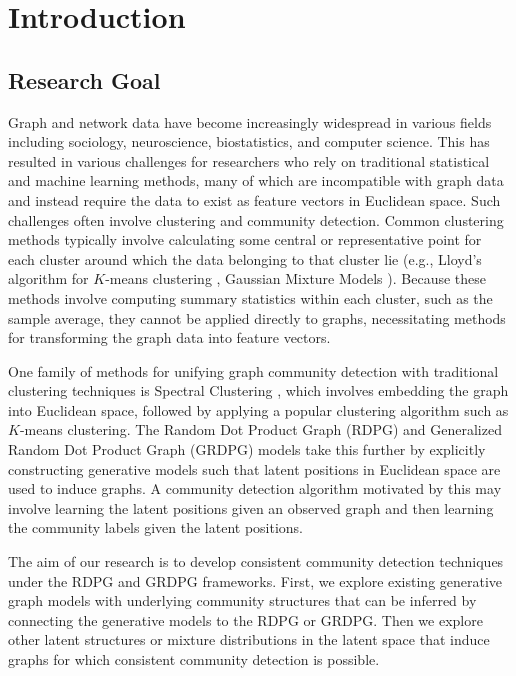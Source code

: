 \documentclass[
  11pt,
]{article}
\begin{document}
\hypertarget{introduction}{%
\section{Introduction}\label{introduction}}

\hypertarget{research-goal}{%
\subsection{Research Goal}\label{research-goal}}

Graph and network data have become increasingly widespread in various
fields including sociology, neuroscience, biostatistics, and computer
science. This has resulted in various challenges for researchers who
rely on traditional statistical and machine learning methods, many of
which are incompatible with graph data and instead require the data to
exist as feature vectors in Euclidean space. Such challenges often
involve clustering and community detection. Common clustering methods
typically involve calculating some central or representative point for
each cluster around which the data belonging to that cluster lie (e.g.,
Lloyd's algorithm for \(K\)-means clustering \cite{1056489}, Gaussian
Mixture Models \cite{doi:10.1198/016214502760047131}). Because these
methods involve computing summary statistics within each cluster, such
as the sample average, they cannot be applied directly to graphs,
necessitating methods for transforming the graph data into feature
vectors.

One family of methods for unifying graph community detection with
traditional clustering techniques is Spectral Clustering
\cite{DBLP:journals/corr/abs-0711-0189}, which involves embedding the
graph into Euclidean space, followed by applying a popular clustering
algorithm such as \(K\)-means clustering. The Random Dot Product Graph
(RDPG) \cite{10.1007/978-3-540-77004-6_11} and Generalized Random Dot
Product Graph (GRDPG) \cite{rubindelanchy2017statistical} models take
this further by explicitly constructing generative models such that
latent positions in Euclidean space are used to induce graphs. A
community detection algorithm motivated by this may involve learning the
latent positions given an observed graph and then learning the community
labels given the latent positions.

The aim of our research is to develop consistent community detection
techniques under the RDPG and GRDPG frameworks. First, we explore
existing generative graph models with underlying community structures
that can be inferred by connecting the generative models to the RDPG or
GRDPG. Then we explore other latent structures or mixture distributions
in the latent space that induce graphs for which consistent community
detection is possible.
\end{document}
